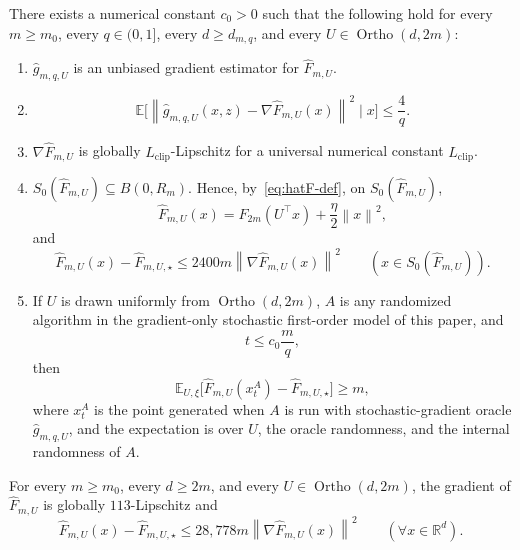 \documentclass[10pt,a4paper]{amsart}
\newcommand{\E}{\mathbb{E}}
\newcommand{\Ortho}{\operatorname{Ortho}}
\newcommand{\R}{\mathbb{R}}
\newcommand{\norm}[1]{\left\lVert #1\right\rVert}
\begin{document}
\begin{lemma}
\label{lem:clipped-rotated}
There exists a numerical constant $c_0>0$ such that the following hold for every $m\ge m_0$, every $q\in(0,1]$, every $d\ge d_{m,q}$, and every $U\in \Ortho(d,2m)$:
\begin{enumerate}[label=\arabic*.,leftmargin=1.5em]
    \item $\widehat g_{m,q,U}$ is an unbiased gradient estimator for $\widehat F_{m,U}$.
    \item
    \[
    \E\bigl[\norm{\widehat g_{m,q,U}(x,z)-\nabla \widehat F_{m,U}(x)}^2\mid x\bigr]\le \frac{4}{q}.
    \]
    \item $\nabla \widehat F_{m,U}$ is globally $L_{\mathrm{clip}}$-Lipschitz for a universal numerical constant $L_{\mathrm{clip}}$.
    \item $S_0(\widehat F_{m,U})\subseteq B(0,R_m)$.
    Hence, by~\eqref{eq:hatF-def}, on $S_0(\widehat F_{m,U})$,
    \[
    \widehat F_{m,U}(x)=F_{2m}(U^\top x)+\frac{\eta}{2}\norm{x}^2,
    \]
    and
    \[
    \widehat F_{m,U}(x)-\widehat F_{m,U,\star}\le 2400m\norm{\nabla \widehat F_{m,U}(x)}^2
    \qquad
    (x\in S_0(\widehat F_{m,U})).
    \]
    \item If $U$ is drawn uniformly from $\Ortho(d,2m)$, $A$ is any randomized algorithm in the gradient-only stochastic
    first-order model of this paper, and
    \[
    t\le c_0\frac{m}{q},
    \]
    then
    \[
    \E_{U,\xi}\bigl[\widehat F_{m,U}(x_t^A)-\widehat F_{m,U,\star}\bigr]\ge m,
    \]
    where \(x_t^A\) is the point generated when \(A\) is run with stochastic-gradient oracle
    \(\widehat g_{m,q,U}\), and the expectation is over $U$, the oracle randomness, and the internal randomness of $A$.
\end{enumerate}
\end{lemma}

\begin{lemma}
\label{lem:endpoint-global-pl}
For every $m\ge m_0$, every $d\ge2m$, and every $U\in\Ortho(d,2m)$, the gradient of
$\widehat F_{m,U}$ is globally $113$-Lipschitz and
\[
\widehat F_{m,U}(x)-\widehat F_{m,U,\star}
\le
28{,}778m\norm{\nabla\widehat F_{m,U}(x)}^2
\qquad
(\forall x\in\R^d).
\]
\end{lemma}
\end{document}
